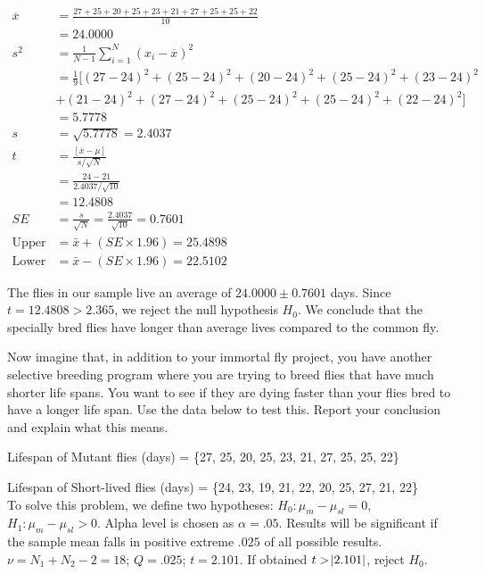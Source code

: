 \documentclass[onecolumn,10pt]{jhwhw}
\begin{document}
\begin{equation*}
\begin{split}
\overline{x} & = \frac{27 + 25 + 20 + 25 + 23 + 21 + 27 + 25 + 25 + 22}{10} \\
             & = 24.0000 \\
s^2 & = \frac{1}{N-1} \sum_{i=1}^N (x_i - \overline{x})^2 \\
    & = \frac{1}{9} [(27-24)^2 + (25-24)^2 + (20-24)^2 + (25-24)^2 + (23-24)^2 \\
    & + (21-24)^2 + (27-24)^2 + (25-24)^2 + (25-24)^2 + (22-24)^2] \\
    & = 5.7778 \\
s & = \sqrt{5.7778} = 2.4037\\
%
t & = \frac{\left[ \overline{x} - \mu \right]}{s/\sqrt{N}} \\
  & = \frac{24 - 21}{2.4037/\sqrt{10}} \\
  & = 12.4808\\
%
SE & = \frac{s}{\sqrt{N}} = \frac{2.4037}{\sqrt{10}} = 0.7601 \\
\text{Upper 95\%} & = \bar{x} + (SE \times 1.96) = 25.4898 \\
\text{Lower 95\%} & = \bar{x} - (SE \times 1.96) = 22.5102
\end{split}
\end{equation*}

The flies in our sample live an average of $24.0000 \pm 0.7601$ days. Since $t = 12.4808 > 2.365$, we reject the null hypothesis $H_0$. We conclude that the specially bred flies have longer than average lives compared to the common fly.

\problem{}
Now imagine that, in addition to your immortal fly project, you have another selective breeding program where you are trying to breed flies that have much shorter life spans. You want to see if they are dying faster than your flies bred to have a longer life span. Use the data below to test this. Report your conclusion and explain what this means.

Lifespan of Mutant flies (days) = \{27, 25, 20, 25, 23, 21, 27, 25, 25, 22\}

Lifespan of Short-lived flies (days) = \{24, 23, 19, 21, 22, 20, 25, 27, 21, 22\} \\

To solve this problem, we define two hypotheses: $H_0: \mu_{m} - \mu_{sl} = 0$, $H_1: \mu_{m} - \mu_{sl} > 0$. Alpha level is chosen as $\alpha = .05$. Results will be significant if the sample mean falls in positive extreme $.025$ of all possible results. $\nu = N_1 + N_2 - 2 = 18$; $Q = .025$; $t = 2.101$. If obtained $t > \abs{2.101}$, reject $H_0$.
\end{document}
